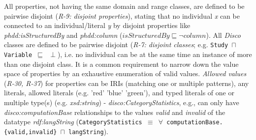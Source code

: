 \documentclass{llncs}
\newcommand{\ms}[1]{\texttt{#1}}
\begin{document}
{{All properties, not having the same domain and range classes, are defined to be pairwise disjoint
(\emph{R-9: disjoint properties}), stating that no individual \emph{x} can be connected to an individual/literal \emph{y} by disjoint properties like \emph{phdd:isStructuredBy} and \emph{phdd:column} ($isStructuredBy \sqsubseteq \neg column$).
All \emph{Disco} classes are defined to be pairwise disjoint (\emph{R-7: disjoint classes}; e.g. \ms{Study $\sqcap$ Variable $\sqsubseteq$ $\perp$}),
i.e. no individual can be at the same time an instance of more than one disjoint class.
It is a common requirement to narrow down the value space of properties by an exhaustive enumeration of valid values.  
\emph{Allowed values} (\emph{R-30, R-37}) for properties can be IRIs (matching one or multiple patterns), any literals, allowed literals (e.g. 'red' 'blue' 'green'), and typed literals of one or multiple type(s) (e.g. \emph{xsd:string}) - 
\emph{disco:CategoryStatistics}, e.g., can only have \emph{disco:computationBase} relationships to the values \emph{valid} and \emph{invalid} of the datatype \emph{rdf:langString} (\ms{CategoryStatistics $\equiv$ $\forall$ computationBase.\{valid,invalid\} $\sqcap$ langString}).

}}
\end{document}

